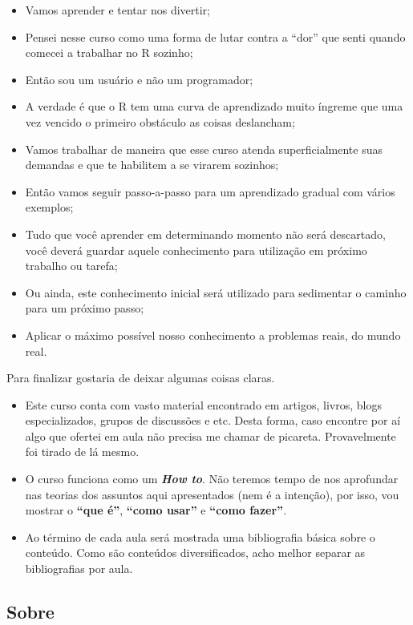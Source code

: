 \documentclass[
]{book}
\begin{document}
\begin{itemize}
\item
  Vamos aprender e tentar nos divertir;
\item
  Pensei nesse curso como uma forma de lutar contra a ``dor'' que senti quando comecei a trabalhar no R sozinho;
\item
  Então sou um usuário e não um programador;
\item
  A verdade é que o R tem uma curva de aprendizado muito íngreme que uma vez vencido o primeiro obstáculo as coisas deslancham;
\item
  Vamos trabalhar de maneira que esse curso atenda superficialmente suas demandas e que te habilitem a se virarem sozinhos;
\item
  Então vamos seguir passo-a-passo para um aprendizado gradual com vários exemplos;
\item
  Tudo que você aprender em determinando momento não será descartado, você deverá guardar aquele conhecimento para utilização em próximo trabalho ou tarefa;
\item
  Ou ainda, este conhecimento inicial será utilizado para sedimentar o caminho para um próximo passo;
\item
  Aplicar o máximo possível nosso conhecimento a problemas reais, do mundo real.
\end{itemize}

Para finalizar gostaria de deixar algumas coisas claras.

\begin{itemize}
\item
  Este curso conta com vasto material encontrado em artigos, livros, blogs especializados, grupos de discussões e etc. Desta forma, caso encontre por aí algo que ofertei em aula não precisa me chamar de picareta. Provavelmente foi tirado de lá mesmo.
\item
  O curso funciona como um \textbf{\emph{How to}}. Não teremos tempo de nos aprofundar nas teorias dos assuntos aqui apresentados (nem é a intenção), por isso, vou mostrar o \textbf{``que é''}, \textbf{``como usar''} e \textbf{``como fazer''}.
\item
  Ao término de cada aula será mostrada uma bibliografia básica sobre o conteúdo. Como são conteúdos diversificados, acho melhor separar as bibliografias por aula.
\end{itemize}

\hypertarget{sobre}{%
\subsection{Sobre}\label{sobre}}
\end{document}
